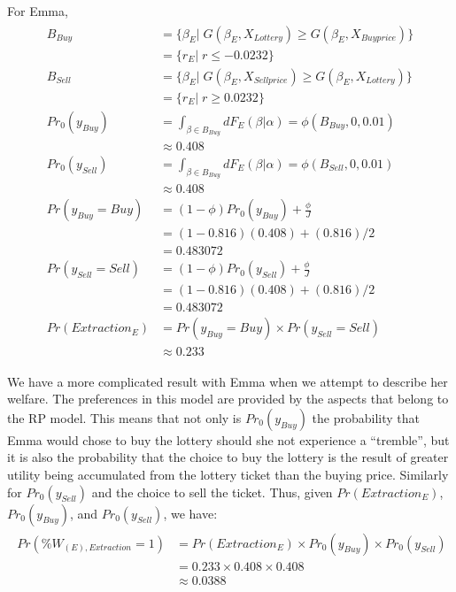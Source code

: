 \documentclass[11pt,a4paper]{report}
\newcommand\Prob{\ensuremath{\mathit{Pr}}}  %
\begin{document}
\noindent For Emma,
\begin{align}
	\label{eq2:Emma}
	\begin{split}
		B_{\mathit{Buy}} &= \{ \beta_E |\; G(\beta_E,X_{\mathit{Lottery}}) \geq G(\beta_E,X_{\mathit{Buy price}})\}\\
		&= \{ r_E \big|\; r \leq -0.0232 \} \\
		B_{\mathit{Sell}} &= \{ \beta_E |\; G(\beta_E,X_{\mathit{Sell price}}) \geq G(\beta_E,X_{\mathit{Lottery}})\}\\
		&= \{ r_E \big|\; r \geq 0.0232 \} \\[0.5ex]
		{\Prob}_0(y_{\mathit{Buy}}) &= \int_{\beta \in B_{\mathit{Buy}}} dF_E(\beta|\alpha) = \phi(B_{\mathit{Buy}},0,0.01)\\[0.5ex]
		&\approx 0.408 \\
		{\Prob}_0(y_{\mathit{Sell}}) &= \int_{\beta \in B_{\mathit{Buy}}} dF_E(\beta|\alpha) = \phi(B_{\mathit{Sell}},0,0.01)\\[0.5ex]
		&\approx 0.408 \\
		{\Prob}(y_{\mathit{Buy}}=\mathit{Buy}) &= (1-\phi) {\Prob}_0(y_{\mathit{Buy}}) + \frac{\phi}{J}\\
		&=(1-0.816)(0.408) + (0.816)/2\\
		&= 0.483072\\
		{\Prob}(y_{\mathit{Sell}}=\mathit{Sell}) &= (1-\phi) {\Prob}_0(y_{\mathit{Sell}}) + \frac{\phi}{J}\\
		&=(1-0.816)(0.408) + (0.816)/2\\
		&= 0.483072\\
		{\Prob}(\mathit{Extraction}_E) &= {\Prob}(y_{\mathit{Buy}} = \mathit{Buy}) \times {\Prob}(y_{\mathit{Sell}} = \mathit{Sell})\\
		&\approx 0.233
	\end{split}
\end{align}

We have a more complicated result with Emma when we attempt to describe her welfare.
The preferences in this model are provided by the aspects that belong to the RP model.
This means that not only is ${\Prob}_0(y_{\mathit{Buy}})$ the probability that Emma would chose to buy the lottery should she not experience a \enquote{tremble}, but it is also the probability that the choice to buy the lottery is the result of greater utility being accumulated from the lottery ticket than the buying price.
Similarly for ${\Prob}_0(y_{\mathit{Sell}})$ and the choice to sell the ticket.
Thus, given ${\Prob}(\mathit{Extraction}_E)$, ${\Prob}_0(y_{\mathit{Buy}})$, and ${\Prob}_0(y_{\mathit{Sell}})$, we have:
\begin{align}
	\begin{split}
		{\Prob}\left(\% W_{(E),\mathit{Extraction}} = 1\right) &= {\Prob}(\mathit{Extraction}_E) \times {\Prob}_0(y_{\mathit{Buy}}) \times {\Prob}_0(y_{\mathit{Sell}})\\
		&= 0.233 \times 0.408 \times 0.408\\
		&\approx 0.0388
	\end{split}
\end{align}
\end{document}
